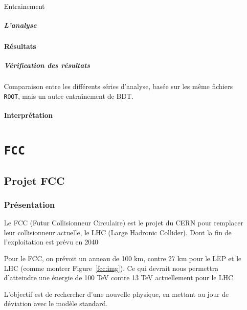 \documentclass[10pt,a4paper]{report}
\newcommand{\ROOT}{\texttt{ROOT}\xspace}
\begin{document}
Entrainement

\paragraph{L'analyse}


\subsubsection{Résultats}

\paragraph{Vérification des résultats}
Comparaison entre les différents séries d'analyse, basée sur les même fichiers \ROOT, mais un autre entraînement de BDT.

\subsubsection{Interprétation}


\chapter{\texttt{FCC}}

\section{Projet FCC}

\subsection{Présentation}

Le FCC (Futur Collisionneur Circulaire) est le projet du CERN pour remplacer 
leur collisionneur actuelle, le LHC (Large Hadronic Collider). 
Dont la fin de l'exploitation est prévu en 2040 \cite{cern:fcc}

Pour le FCC, on prévoit un anneau de 100 km, contre 27 km pour le LEP et le LHC 
(comme montrer Figure~\ref{fcc:img}).
Ce qui devrait nous permettra d'atteindre une énergie de 100 TeV contre 13 TeV
actuellement pour le LHC.

L'objectif est de rechercher d'une nouvelle physique, en mettant au jour de 
déviation avec le modèle standard.
\end{document}

